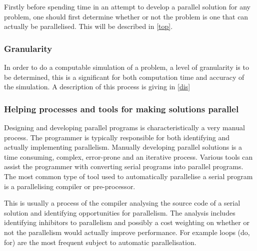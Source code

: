 Firstly before spending time in an attempt to develop a parallel solution for any problem, one should first determine whether or not the problem is one that can actually be parallelised. This will be described in \cref{top}.

\subsubsection{Granularity}

In order to do a computable simulation of a problem, a level of granularity is to be determined, this is a significant for both computation time and accuracy of the simulation. A description of this process is giving in \cref{dis}

\subsubsection{Helping processes and tools for making solutions parallel}

Designing and developing parallel programs is characteristically a very manual process. The programmer is typically responsible for both identifying and actually implementing parallelism. Manually developing parallel solutions is a time consuming, complex, error-prone and an iterative process. Various tools can assist the programmer with converting serial programs into parallel programs. The most common type of tool used to automatically parallelise a serial program is a parallelising compiler or pre-processor.

This is usually a process of the compiler analysing the source code of a serial solution and identifying opportunities for parallelism. The analysis includes identifying inhibitors to parallelism and possibly a cost weighting on whether or not the parallelism would actually improve performance. For example loops (do, for) are the most frequent subject to automatic parallelisation.